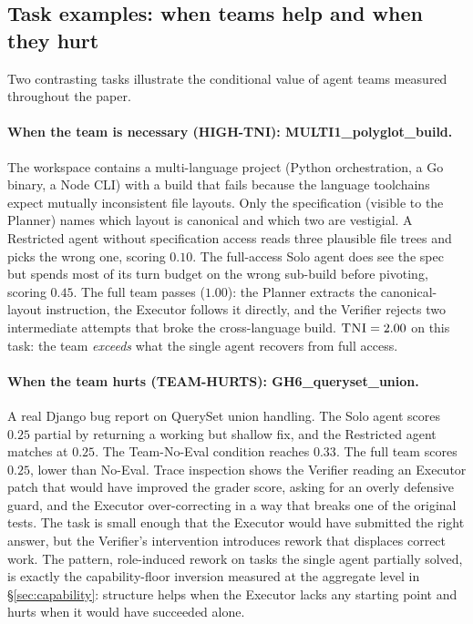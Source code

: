 \documentclass{article}
\newcommand{\tni}{\textsc{TNI}}
\begin{document}
\subsection{Task examples: when teams help and when they hurt}
\label{app:example}

Two contrasting tasks illustrate the conditional value of agent teams measured throughout the paper.

\paragraph{When the team is necessary (HIGH-TNI): MULTI1\_polyglot\_build.}
The workspace contains a multi-language project (Python orchestration, a Go binary, a Node CLI) with a build that fails because the language toolchains expect mutually inconsistent file layouts. Only the specification (visible to the Planner) names which layout is canonical and which two are vestigial. A Restricted agent without specification access reads three plausible file trees and picks the wrong one, scoring $0.10$. The full-access Solo agent does see the spec but spends most of its turn budget on the wrong sub-build before pivoting, scoring $0.45$. The full team passes ($1.00$): the Planner extracts the canonical-layout instruction, the Executor follows it directly, and the Verifier rejects two intermediate attempts that broke the cross-language build. $\tni = 2.00$ on this task: the team \emph{exceeds} what the single agent recovers from full access.

\paragraph{When the team hurts (TEAM-HURTS): GH6\_queryset\_union.}
A real Django bug report on QuerySet union handling. The Solo agent scores $0.25$ partial by returning a working but shallow fix, and the Restricted agent matches at $0.25$. The Team-No-Eval condition reaches $0.33$. The full team scores $0.25$, lower than No-Eval. Trace inspection shows the Verifier reading an Executor patch that would have improved the grader score, asking for an overly defensive guard, and the Executor over-correcting in a way that breaks one of the original tests. The task is small enough that the Executor would have submitted the right answer, but the Verifier's intervention introduces rework that displaces correct work. The pattern, role-induced rework on tasks the single agent partially solved, is exactly the capability-floor inversion measured at the aggregate level in \S\ref{sec:capability}: structure helps when the Executor lacks any starting point and hurts when it would have succeeded alone.

\newpage

\end{document}
